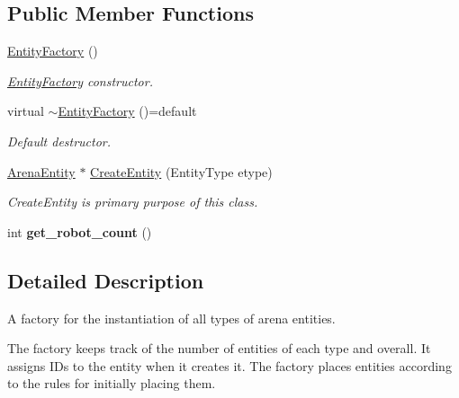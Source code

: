 \subsection*{Public Member Functions}
\begin{DoxyCompactItemize}
\item 
\hyperlink{classEntityFactory_abaf0c4ceaa682e55f69b0ceae230008a}{Entity\+Factory} ()\hypertarget{classEntityFactory_abaf0c4ceaa682e55f69b0ceae230008a}{}\label{classEntityFactory_abaf0c4ceaa682e55f69b0ceae230008a}

\begin{DoxyCompactList}\small\item\em \hyperlink{classEntityFactory}{Entity\+Factory} constructor. \end{DoxyCompactList}\item 
virtual \hyperlink{classEntityFactory_ae3246f06fa101178803f76582323d4ad}{$\sim$\+Entity\+Factory} ()=default\hypertarget{classEntityFactory_ae3246f06fa101178803f76582323d4ad}{}\label{classEntityFactory_ae3246f06fa101178803f76582323d4ad}

\begin{DoxyCompactList}\small\item\em Default destructor. \end{DoxyCompactList}\item 
\hyperlink{classArenaEntity}{Arena\+Entity} $\ast$ \hyperlink{classEntityFactory_abf7b1ac4ec275728b47c37fcd85f81e8}{Create\+Entity} (Entity\+Type etype)
\begin{DoxyCompactList}\small\item\em Create\+Entity is primary purpose of this class. \end{DoxyCompactList}\item 
int {\bfseries get\+\_\+robot\+\_\+count} ()\hypertarget{classEntityFactory_acc8d2184f834fe2f663fea781b6aba80}{}\label{classEntityFactory_acc8d2184f834fe2f663fea781b6aba80}

\end{DoxyCompactItemize}


\subsection{Detailed Description}
A factory for the instantiation of all types of arena entities. 

The factory keeps track of the number of entities of each type and overall. It assigns ID\textquotesingle{}s to the entity when it creates it. The factory places entities according to the rules for initially placing them. 

